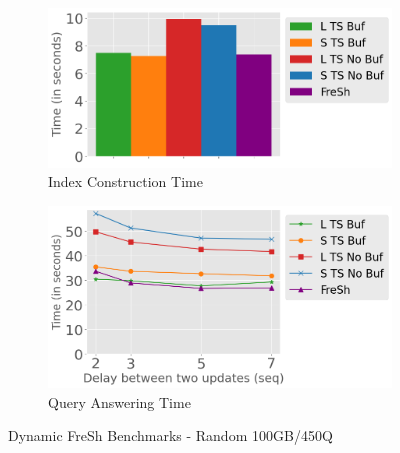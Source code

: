 \begin{figure}
	\centering
	\begin{subfigure}[c]{0.45\textwidth}
		\includegraphics[width=1\textwidth]   {figures/Experiments/Dynamic/Delays/index_construction_all.png}
		\caption{Index Construction Time}
		\label{fig:actual-index-Construction-time}
	\end{subfigure}
	\begin{subfigure}[c]{0.45\textwidth}
		\includegraphics[width=1\textwidth]   {figures/Experiments/Dynamic/Delays/qa_delay_x_axis.png}
		\caption{Query Answering Time}
		\label{fig:actual-query-answering-time}
	\end{subfigure}
	\caption{Dynamic FreSh Benchmarks - Random 100GB/450Q}
	\label{fig:dfresh-fresh-random}
\end{figure}


